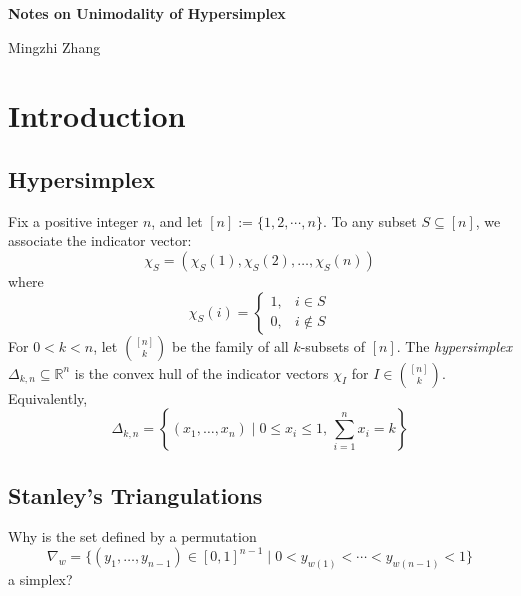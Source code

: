 \documentclass[12pt]{article}
\theoremstyle{definition}
\numberwithin{equation}{subsection}
\begin{document}
\begin{center}
    {\Large\bf Notes on Unimodality of Hypersimplex}
\end{center}
\vskip 3mm
\begin{center}
    Mingzhi Zhang
\end{center}
\vskip 3mm

\section{Introduction}

\subsection{Hypersimplex}
Fix a positive integer $n$, and let $[n]:= \{1, 2, \cdots , n\}$. To any subset $S \subseteq [n]$, we associate the indicator vector:
\[
\chi_{S} = (\chi_{S}(1), \chi_{S}(2), \ldots, \chi_{S}(n))
\]
where 
\[
\chi_{S}(i) = 
\begin{cases} 
1, & i \in S \\
0, & i \notin S
\end{cases}
\]
For $0 < k < n$, let $\binom{[n]}{k}$ be the family of all $k$-subsets of $[n]$. The \textit{hypersimplex} $\Delta_{k,n} \subseteq \mathbb{R}^n$ is the convex hull of the indicator vectors $\chi_I$ for $I \in \binom{[n]}{k}$. Equivalently,
\[
\Delta_{k,n} = \left\{ (x_1, \ldots, x_n) \mid 0 \leq x_i \leq 1,\, \sum_{i=1}^n x_i = k \right\}
\]

\subsection{Stanley's Triangulations}
Why is the set defined by a permutation
\[
\nabla_w = \{(y_1,\dots,y_{n-1})\in [0,1]^{n-1} \mid 0 < y_{w(1)} < \cdots < y_{w(n-1)} < 1\}
\]
a simplex?
\end{document}
